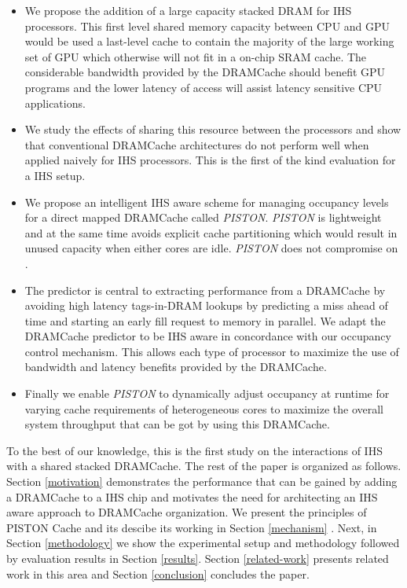 \begin{itemize}

\item We propose the addition of a large capacity stacked DRAM for IHS processors. This first level shared memory capacity between CPU and GPU would be used a last-level cache to contain the majority of the large working set of GPU which otherwise will not fit in a on-chip SRAM cache. The considerable bandwidth provided by the DRAMCache should benefit GPU programs and the lower latency of access will assist latency sensitive CPU applications. 
\item We study the effects of sharing this resource between the processors and show that conventional DRAMCache architectures do not perform well when applied naively for IHS processors. This is the first of the kind evaluation for a IHS setup.
\item We propose an intelligent IHS aware scheme for managing occupancy levels for a direct mapped DRAMCache called \textit{PISTON}. \textit{PISTON} is lightweight and at the same time avoids explicit cache partitioning which would result in unused capacity when either cores are idle. \textit{PISTON} does not compromise on .
\item The predictor is central to extracting performance from a DRAMCache by avoiding high latency tags-in-DRAM lookups by predicting a miss ahead of time and starting an early fill request to memory in parallel. We adapt the DRAMCache predictor to be IHS aware in concordance with our occupancy control mechanism. This allows each type of processor to maximize the use of bandwidth and latency benefits provided by the DRAMCache.
\item Finally we enable \textit{PISTON} to dynamically adjust occupancy at runtime for varying cache requirements of heterogeneous cores to maximize the overall system throughput that can be got by using this DRAMCache.

\end{itemize}
To the best of our knowledge, this is the first study on the interactions of IHS with a shared stacked DRAMCache. The rest of the paper is organized as follows. Section \ref{motivation} demonstrates the performance that can be gained by adding a DRAMCache to a IHS chip and motivates the need for architecting an IHS aware approach to DRAMCache organization. We present the principles of PISTON Cache and its descibe its working in Section \ref{mechanism} . Next, in Section \ref{methodology} we show the experimental setup and methodology followed by evaluation results in Section \ref{results}. Section \ref{related-work} presents related work in this area and Section \ref{conclusion} concludes the paper.
